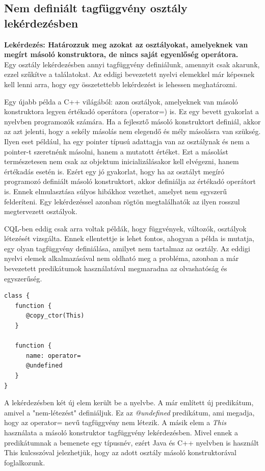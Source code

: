 \documentclass[a4paper,12pt]{report}
\begin{document}
\subsection{Nem definiált tagfüggvény osztály lekérdezésben}
\textbf{Lekérdezés: Határozzuk meg azokat az osztályokat, amelyeknek van megírt másoló konstruktora, de nincs saját egyenlőség operátora.}
\\
Egy osztály lekérdezésben annyi tagfüggvény definiálunk, amennyit csak akarunk, ezzel szűkítve a találatokat. Az eddigi bevezetett nyelvi elemekkel már képesnek kell lenni arra, hogy egy összetettebb lekérdezést is lehessen meghatározni.
\par Egy újabb példa a C++ világából: azon osztályok, amelyeknek van másoló konstruktora legyen értékadó operátora (operator=) is. Ez egy bevett gyakorlat a nyelvben programozók számára. Ha a fejlesztő másoló konstruktort definiál, akkor az azt jelenti, hogy a sekély másolás nem elegendő és mély másolásra van szükség. Ilyen eset például, ha egy pointer típusú adattagja van az osztálynak és nem a pointer-t szeretnénk másolni, hanem a mutatott értéket. Ezt a másolást természetesen nem csak az objektum inicializálásakor kell elvégezni, hanem értékadás esetén is. Ezért egy jó gyakorlat, hogy ha az osztályt megíró programozó definiált másoló konstruktort, akkor definiálja az értékadó operátort is. Ennek elmulasztása súlyos hibákhoz vezethet, amelyet nem egyszerű felderíteni. Egy lekérdezéssel azonban rögtön megtalálhatók az ilyen rosszul megtervezett osztályok.
\par CQL-ben eddig csak arra voltak példák, hogy függvények, változók, osztályok létezését vizsgálta. Ennek ellentettje is lehet fontos, ahogyan a példa is mutatja, egy olyan tagfüggvény definiálása, amilyet nem tartalmaz az osztály. Az eddigi nyelvi elemek alkalmazásával nem oldható meg a probléma, azonban a már bevezetett predikátumok használatával megmaradna az olvashatóság és egyszerűség.
\begin{verbatim}
class {
   function { 
      @copy_ctor(This) 
   }
   
   function {
      name: operator= 
      @undefined
   }
}
\end{verbatim}
\par A lekérdezésben két új elem került be a nyelvbe. A már említett új predikátum, amivel a "nem-létezést" definiáljuk. Ez az \textit{@undefined} predikátum, ami megadja, hogy az operator= nevű tagfüggvény nem létezik. A másik elem a \textit{This} használata a másoló konstruktor tagfüggvény lekérdezésben. Mivel ennek a predikátumnak a bemenete egy típusnév, ezért Java és C++ nyelvben is használt This kulcsszóval jelezhetjük, hogy az adott osztály másoló konstruktorával foglalkozunk.
\end{document}
